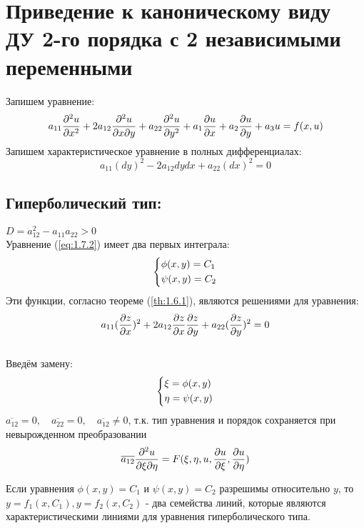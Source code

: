 \documentclass[../main.tex]{subfiles}
\begin{document}
\section{Приведение к каноническому виду ДУ 2-го порядка с 2 независимыми переменными}

Запишем уравнение:
\begin{equation}\label{eq:1.7.1}
	a_{11}\frac{\partial^2u}{\partial x^2} + 2a_{12}\frac{\partial^2u}{\partial x \partial y} + a_{22}\frac{\partial^2u}{\partial y^2} + a_1\frac{\partial u}{\partial x} +a_2\frac{\partial u}{\partial y}+a_3u = f(x,u)
\end{equation}
Запишем характеристическое уравнение в полных дифференциалах:
\begin{equation}
	\label{eq:1.7.2}
	a_{11}(dy)^2 - 2a_{12}dydx + a_{22}(dx)^2 = 0
\end{equation}

\subsection*{Гиперболический тип: }
$D = a_{12}^2 - a_{11}a_{22} > 0$
\\
Уравнение (\ref*{eq:1.7.2}) имеет два первых интеграла:
$$\begin{dcases}\phi(x,y) = C_1 \\ \psi(x,y) = C_2\end{dcases}$$
Эти функции, согласно теореме (\ref{th:1.6.1}), являются решениями для уравнения:
\begin{equation}\label{eq:1.7.3}
	a_{11}(\frac{\partial z}{\partial x})^2 + 2a_{12}\frac{\partial z}{\partial x}\frac{\partial z}{\partial y} + a_{22}(\frac{\partial z}{\partial y})^2 = 0
\end{equation}
\\
Введём замену:
$$\begin{dcases}\xi = \phi(x,y) \\ \eta = \psi(x,y) \end{dcases}$$
$\overline{a_{12}} = 0, \quad \overline{a_{22}}=0, \quad \overline{a_{12}}\neq0$, т.к. тип уравнения и порядок сохраняется при невырожденном преобразовании\\
$$\overline{a_{12}}\frac{\partial^2u}{\partial\xi\partial\eta}=F(\xi, \eta, u, \frac{\partial u}{\partial \xi}, \frac{\partial u}{\partial \eta})$$

\par Если уравнения $\phi(x,y) = C_1$ и $\psi(x,y)=C_2$ разрешимы относительно $y$, то $y=f_1(x, C_1), y=f_2(x, C_2)$ - два семейства линий, которые являются характеристическими линиями для уравнения гиперболического типа. \\
\end{document}
